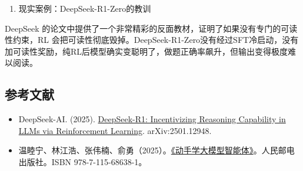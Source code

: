 \begin{enumerate}
\def\labelenumi{\arabic{enumi}.}
\setcounter{enumi}{3}
\tightlist
\item
  现实案例：DeepSeek-R1-Zero的教训
\end{enumerate}

DeepSeek 的论文中提供了一个非常精彩的反面教材，证明了如果没有专门的可读性约束，RL 会把可读性彻底毁掉。DeepSeek-R1-Zero没有经过SFT冷启动，没有加可读性奖励，纯RL后模型确实变聪明了，做题正确率飙升，但输出变得极度难以阅读。

\FloatBarrier
{}
\hypertarget{ux53c2ux8003ux6587ux732e-82}{%
\subsection{参考文献}\label{ux53c2ux8003ux6587ux732e-82}}

\vspace{0.25em}
\begin{itemize}
\tightlist
\item
  DeepSeek-AI. (2025). \href{https://arxiv.org/abs/2501.12948}{DeepSeek-R1: Incentivizing Reasoning Capability in LLMs via Reinforcement Learning}. arXiv:2501.12948.
\item
  温睦宁、林江浩、张伟楠、俞勇（2025）。\href{https://haa.boyuai.com/}{《动手学大模型智能体》}。人民邮电出版社。ISBN 978-7-115-68638-1。
\end{itemize}

\clearpage
